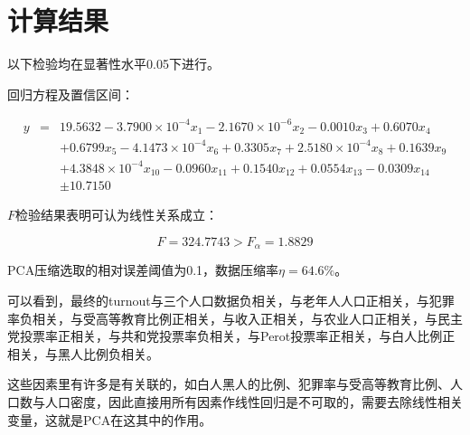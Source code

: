 \documentclass[UTF8]{ctexart}
\begin{document}
\section{计算结果}
以下检验均在显著性水平0.05下进行。\par
回归方程及置信区间：\par
\begin{eqnarray*}
y&=&19.5632-3.7900\times 10^{-4}x_{1}-2.1670\times 10^{-6}x_{2}-0.0010x_{3}+0.6070x_{4}\\
& &+0.6799x_{5}-4.1473\times 10^{-4}x_{6}+0.3305x_{7}+2.5180\times 10^{-4}x_{8}+0.1639x_{9}\\
& &+4.3848\times 10^{-4}x_{10}-0.0960x_{11}+0.1540x_{12}+0.0554x_{13}-0.0309x_{14}\\
& &\pm 10.7150
\end{eqnarray*}
\par
$F$检验结果表明可认为线性关系成立：\par
\begin{equation}
F=324.7743>F_{\alpha}=1.8829
\end{equation}
\par
PCA压缩选取的相对误差阈值为0.1，数据压缩率$\eta=64.6\%$。\par
可以看到，最终的turnout与三个人口数据负相关，与老年人人口正相关，与犯罪率负相关，与受高等教育比例正相关，与收入正相关，与农业人口正相关，与民主党投票率正相关，与共和党投票率负相关，与Perot投票率正相关，与白人比例正相关，与黑人比例负相关。\par
这些因素里有许多是有关联的，如白人黑人的比例、犯罪率与受高等教育比例、人口数与人口密度，因此直接用所有因素作线性回归是不可取的，需要去除线性相关变量，这就是PCA在这其中的作用。
\end{document}
